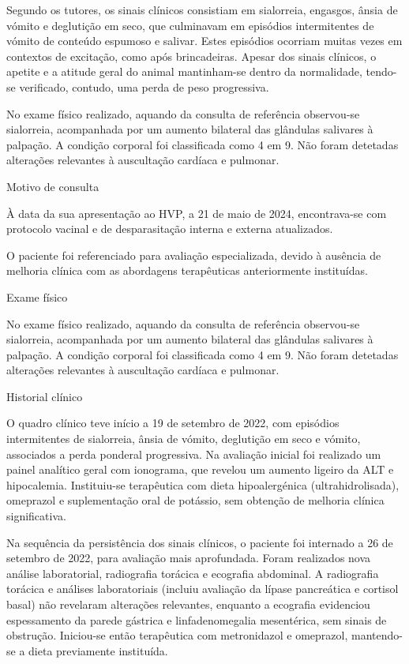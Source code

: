 Segundo os tutores, os sinais clínicos consistiam em sialorreia, engasgos, ânsia de vómito e deglutição em seco, que culminavam em episódios intermitentes de vómito de conteúdo espumoso e salivar. Estes episódios ocorriam muitas vezes em contextos de excitação, como após brincadeiras. Apesar dos sinais clínicos, o apetite e a atitude geral do animal mantinham-se dentro da normalidade, tendo-se verificado, contudo, uma perda de peso progressiva.


No exame físico realizado, aquando da consulta de referência observou-se sialorreia, acompanhada por um aumento bilateral das glândulas salivares à palpação. A condição corporal foi classificada como 4 em 9. Não foram detetadas alterações relevantes à auscultação cardíaca e pulmonar.

Motivo de consulta

À data da sua apresentação ao HVP, a 21 de maio de 2024, encontrava-se com protocolo vacinal e de desparasitação interna e externa atualizados. 


O paciente foi referenciado para avaliação especializada, devido à   ausência de melhoria clínica com as abordagens terapêuticas anteriormente instituídas. 

Exame físico

No exame físico realizado, aquando da consulta de referência observou-se sialorreia, acompanhada por um aumento bilateral das glândulas salivares à palpação. A condição corporal foi classificada como 4 em 9. Não foram detetadas alterações relevantes à auscultação cardíaca e pulmonar. 


Historial clínico


O quadro clínico teve início a 19 de setembro de 2022, com episódios intermitentes de sialorreia, ânsia de vómito, deglutição em seco e vómito, associados a perda ponderal progressiva. Na avaliação inicial foi realizado um painel analítico geral com ionograma, que revelou um aumento ligeiro da ALT e hipocalemia. Instituiu-se terapêutica com dieta hipoalergénica (ultrahidrolisada), omeprazol e suplementação oral de potássio, sem obtenção de melhoria clínica significativa.


Na sequência da persistência dos sinais clínicos, o paciente foi internado a 26 de setembro de 2022, para avaliação mais aprofundada. Foram realizados nova análise laboratorial, radiografia torácica e ecografia abdominal. A radiografia torácica e análises laboratoriais (incluiu avaliação da lípase pancreática e cortisol basal) não revelaram alterações relevantes, enquanto a ecografia evidenciou espessamento da parede gástrica e linfadenomegalia mesentérica, sem sinais de obstrução. Iniciou-se então terapêutica com metronidazol e omeprazol, mantendo-se a dieta previamente instituída.


